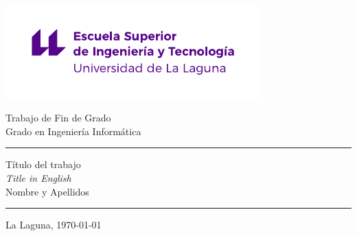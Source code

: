 \documentclass[a4paper,12pt,oneside]{scrbook}
\begin{document}
   



\pagestyle{empty}
\newcommand{\HRule}{\rule{\linewidth}{0.3mm}}
{
    \setlength{\parindent}{0mm}
    \setlength{\parskip}{0mm}
    
    \vspace*{1.20cm}
    \includegraphics[width=9.81cm]{images/logos/escuela-ingenieria-tecnologia-original}
    
    {\centering
    \fontsize{32pt}{32pt}\selectfont Trabajo de Fin de Grado\\[10pt]
    \fontsize{20pt}{20pt}\selectfont Grado en Ingeniería Informática\par}
    \HRule\vspace*{2mm}
    \begin{flushright}
            {\fontsize{32pt}{32pt}\selectfont Título del trabajo} \\[3mm]
            {\fontsize{18pt}{18pt}\selectfont \textit{Title in English}} \\[11mm]
            {\fontsize{16pt}{16pt}\selectfont Nombre y Apellidos}
    \end{flushright}\vspace*{12mm}
    \HRule
    
    \begin{center}
        \fontsize{18pt}{18pt}\selectfont La Laguna, \today
    \end{center}
}

\frontmatter
{}
\thispagestyle{empty}
\end{document}
